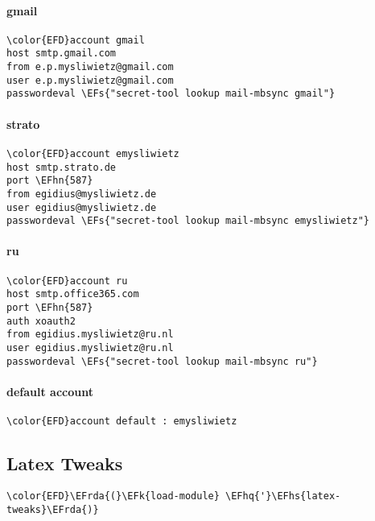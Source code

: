 \documentclass[a4wide,10pt]{article}
\newcommand{\EFs}[1]{\textcolor{EFs}{#1}} %
\newcommand{\EFk}[1]{\textcolor{EFk}{#1}} %
\newcommand{\EFhn}[1]{\textcolor{EFhn}{\textbf{#1}}} %
\newcommand{\EFhq}[1]{\textcolor{EFhq}{#1}} %
\newcommand{\EFhs}[1]{\textcolor{EFhs}{#1}} %
\newcommand{\EFrda}[1]{\textcolor{EFrda}{#1}} %
\begin{document}
\paragraph{gmail}
\label{sec:org49f1804}
\begin{Code}
\begin{Verbatim}
\color{EFD}account gmail
host smtp.gmail.com
from e.p.mysliwietz@gmail.com
user e.p.mysliwietz@gmail.com
passwordeval \EFs{"secret-tool lookup mail-mbsync gmail"}

\end{Verbatim}
\end{Code}
\paragraph{strato}
\label{sec:org08ef52d}
\begin{Code}
\begin{Verbatim}
\color{EFD}account emysliwietz
host smtp.strato.de
port \EFhn{587}
from egidius@mysliwietz.de
user egidius@mysliwietz.de
passwordeval \EFs{"secret-tool lookup mail-mbsync emysliwietz"}

\end{Verbatim}
\end{Code}
\paragraph{ru}
\label{sec:org744e601}
\begin{Code}
\begin{Verbatim}
\color{EFD}account ru
host smtp.office365.com
port \EFhn{587}
auth xoauth2
from egidius.mysliwietz@ru.nl
user egidius.mysliwietz@ru.nl
passwordeval \EFs{"secret-tool lookup mail-mbsync ru"}

\end{Verbatim}
\end{Code}
\paragraph{default account}
\label{sec:org90efce7}
\begin{Code}
\begin{Verbatim}
\color{EFD}account default : emysliwietz
\end{Verbatim}
\end{Code}
\subsection{Latex Tweaks}
\label{sec:org6596c67}
\begin{Code}
\begin{Verbatim}
\color{EFD}\EFrda{(}\EFk{load-module} \EFhq{'}\EFhs{latex-tweaks}\EFrda{)}
\end{Verbatim}
\end{Code}
\end{document}
